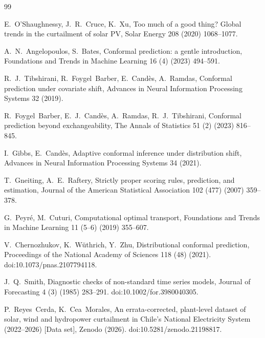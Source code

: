 \documentclass[preprint,3p,times]{elsarticle}
\begin{document}
\begin{thebibliography}{99}

E.~O'Shaughnessy, J.~R.~Cruce, K.~Xu,
Too much of a good thing? Global trends in the curtailment of solar PV,
Solar Energy 208 (2020) 1068--1077.

A.~N.~Angelopoulos, S.~Bates,
Conformal prediction: a gentle introduction,
Foundations and Trends in Machine Learning 16 (4) (2023) 494--591.

R.~J.~Tibshirani, R.~Foygel~Barber, E.~Cand\`es, A.~Ramdas,
Conformal prediction under covariate shift,
Advances in Neural Information Processing Systems 32 (2019).

R.~Foygel~Barber, E.~J.~Cand\`es, A.~Ramdas, R.~J.~Tibshirani,
Conformal prediction beyond exchangeability,
The Annals of Statistics 51 (2) (2023) 816--845.

I.~Gibbs, E.~Cand\`es,
Adaptive conformal inference under distribution shift,
Advances in Neural Information Processing Systems 34 (2021).

T.~Gneiting, A.~E.~Raftery,
Strictly proper scoring rules, prediction, and estimation,
Journal of the American Statistical Association 102 (477) (2007) 359--378.

G.~Peyr\'e, M.~Cuturi,
Computational optimal transport,
Foundations and Trends in Machine Learning 11 (5--6) (2019) 355--607.

V.~Chernozhukov, K.~W\"uthrich, Y.~Zhu,
Distributional conformal prediction,
Proceedings of the National Academy of Sciences 118 (48) (2021).
doi:10.1073/pnas.2107794118.

J.~Q.~Smith,
Diagnostic checks of non-standard time series models,
Journal of Forecasting 4 (3) (1985) 283--291.
doi:10.1002/for.3980040305.

P.~Reyes~Cerda, K.~Cea~Morales,
An errata-corrected, plant-level dataset of solar, wind and hydropower curtailment in Chile's National Electricity System (2022--2026) [Data set],
Zenodo (2026). doi:10.5281/zenodo.21198817.

\end{thebibliography}
\end{document}
